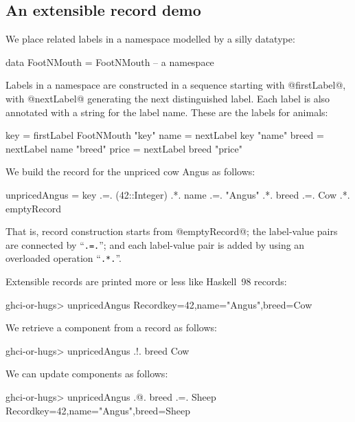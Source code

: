 \documentclass[nocopyrightspace,preprint]{sigplan-proc}
\newcommand{\hwVsTr}[2]{#2}
\begin{document}
\medskip

\subsection*{An extensible record demo}

We place related labels in a namespace modelled by a silly datatype:

\begin{code}
 data FootNMouth = FootNMouth  -- a namespace
\end{code}

Labels in a namespace are constructed in a sequence starting with
@firstLabel@, with @nextLabel@ generating the next
distinguished label. Each label is also annotated with a string for
the label name. These are the labels for animals:

\begin{code}
 key   = firstLabel FootNMouth "key"
 name  = nextLabel  key        "name"
 breed = nextLabel  name       "breed"
 price = nextLabel  breed      "price"  
\end{code}

\hwVsTr{}{\newpage}

We build the record for the unpriced cow Angus as follows:

\begin{code}
 unpricedAngus =  key    .=. (42::Integer)
              .*. name   .=. "Angus"
              .*. breed  .=. Cow
              .*. emptyRecord
\end{code}

That is, record construction starts from @emptyRecord@; the
label-value pairs are connected by ``\verb!.=.!''; and each
label-value pair is added by using an overloaded operation
``\verb!.*.!''.

Extensible records are printed more or less like Haskell~98 records:

\begin{code}
 ghci-or-hugs> unpricedAngus
 Record{key=42,name="Angus",breed=Cow}
\end{code}

We retrieve a component from a record as follows:

\begin{code}
 ghci-or-hugs> unpricedAngus .!. breed
 Cow
\end{code}

We can update components as follows:

\begin{code}
 ghci-or-hugs> unpricedAngus .@. breed .=. Sheep
 Record{key=42,name="Angus",breed=Sheep}
\end{code}
\end{document}
